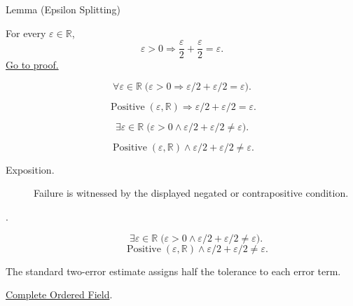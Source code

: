 \begin{lemmabox}{Lemma (Epsilon Splitting)}
\begin{lemma}
\label{lem:epsilon-splitting}
For every $\varepsilon\in\mathbb{R}$,
\[
  \varepsilon>0
  \Longrightarrow
  \frac{\varepsilon}{2}+\frac{\varepsilon}{2}=\varepsilon.
\]
\hyperref[prf:epsilon-splitting]{Go to proof.}
\end{lemma}
\end{lemmabox}
\begin{remark*}
\[
\forall \varepsilon\in\mathbb{R}\;\bigl(\varepsilon>0\Longrightarrow
\varepsilon/2+\varepsilon/2=\varepsilon\bigr).
\]
\end{remark*}
\begin{remark*}
\[
\operatorname{Positive}(\varepsilon,\mathbb{R})\Longrightarrow
\varepsilon/2+\varepsilon/2=\varepsilon.
\]
\end{remark*}
\begin{remark*}
\[
\exists\varepsilon\in\mathbb{R}\;\bigl(\varepsilon>0\land
\varepsilon/2+\varepsilon/2\ne\varepsilon\bigr).
\]
\end{remark*}
\begin{remark*}
\[
\operatorname{Positive}(\varepsilon,\mathbb{R})\land
\varepsilon/2+\varepsilon/2\ne\varepsilon.
\]
\end{remark*}

\begin{remark*}
\begin{description}
  \item[Exposition.]
  Failure is witnessed by the displayed negated or contrapositive condition.

  \item[.]
  \[
\exists\varepsilon\in\mathbb{R}\;\bigl(\varepsilon>0\land
\varepsilon/2+\varepsilon/2\ne\varepsilon\bigr).
\]
\[
\operatorname{Positive}(\varepsilon,\mathbb{R})\land
\varepsilon/2+\varepsilon/2\ne\varepsilon.
\]
\end{description}
\end{remark*}
\begin{remark*}[Interpretation]
The standard two-error estimate assigns half the tolerance to each error term.
\end{remark*}
\begin{dependencies}
\hyperref[def:real-ordered-field]{Complete Ordered Field}.
\end{dependencies}

